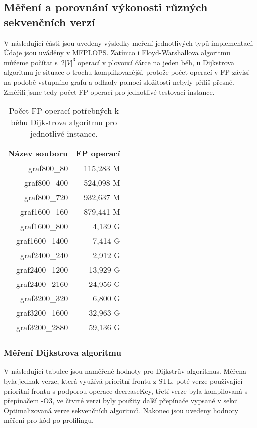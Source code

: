 \documentclass[a4paper,11pt]{article}
\begin{document}
\subsection{Měření a porovnání výkonosti různých sekvenčních verzí}
V následující části jsou uvedeny výsledky meření jednotlivých typů implementací. Údaje jsou uváděny v MFPLOPS. Zatímco i Floyd-Warshallova algoritmu můžeme počítat s~$2|V|^3$ operací v plovoucí čárce na jeden běh, u Dijkstrova algoritmu je situace o trochu komplikovanější, protože počet operací v FP závisí na podobě vstupního grafu a odhady pomocí složitosti nebyly příliš přesné. Změřili jsme tedy počet FP operací pro jednotlivé testovací instance.
\begin{table}[H]
  \begin{center}
      \begin{tabular}{|r|r|}
      \hline
      Název souboru 	& FP operací  	\\ \hline
      graf800\_80  	& 115,283 M            		\\ \hline
      graf800\_400     	& 524,098 M    		     	\\ \hline
      graf800\_720  	& 932,637 M    	            	\\ \hline
      graf1600\_160    	& 879,441 M    	        	\\ \hline
      graf1600\_800  	& 4,139 G    	           	\\ \hline
      graf1600\_1400   	& 7,414 G    	         	\\ \hline
      graf2400\_240  	& 2,912 G    	          	\\ \hline
      graf2400\_1200   	& 13,929 G    	         	\\ \hline
      graf2400\_2160  	& 24,956 G    	            	\\ \hline
      graf3200\_320    	& 6,800 G             		\\ \hline
      graf3200\_1600  	& 32,963 G    	            	\\ \hline
      graf3200\_2880   	& 59,136 G    	         	\\ \hline
      \end{tabular}
  \caption{Počet FP operací potřebných k běhu Dijkstrova algoritmu pro jednotlivé instance.}
  \label{tab:fp_operace}
  \end{center}
\end{table}

\subsubsection{Měření Dijkstrova algoritmu}
V následující tabulce jsou naměřené hodnoty pro Dijkstrův algoritmus. Mě\-ře\-na byla jednak verze, která využívá prioritní frontu z STL, poté verze používající prioritní frontu s podporou operace decreaseKey, třetí verze byla kompilovaná s pře\-pí\-načem -O3, ve čtvrté verzi byly použity další pře\-pí\-nače vypsané v sekci Optimalizovaná verze sekvenčních algoritmů. Nakonec jsou uvedeny hodnoty měření pro kód po profilingu.
\par
\end{document}
